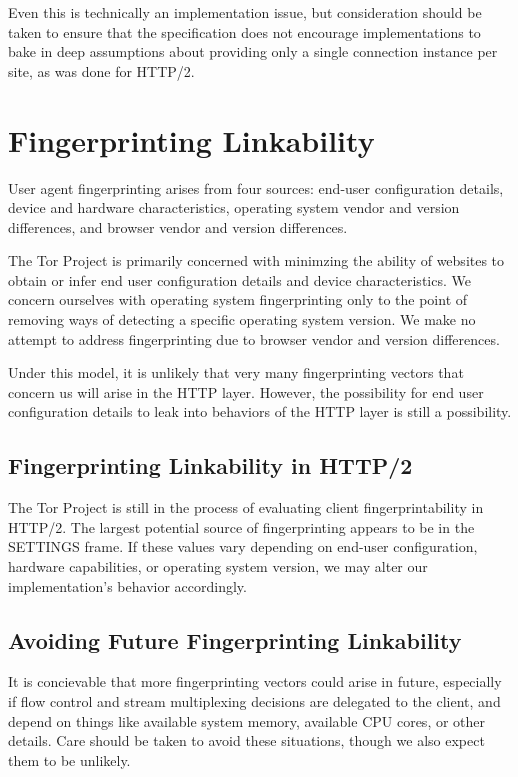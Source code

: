 \documentclass[letterpaper,11pt]{llncs}
\begin{document}
Even this is technically an implementation issue, but consideration should be
taken to ensure that the specification does not encourage implementations to
bake in deep assumptions about providing only a single connection instance per
site, as was done for HTTP/2.

\section{Fingerprinting Linkability}

User agent fingerprinting arises from four sources: end-user configuration
details, device and hardware characteristics, operating system vendor and
version differences, and browser vendor and version differences.

The Tor Project is primarily concerned with minimzing the ability of websites
to obtain or infer end user configuration details and device characteristics.
We concern ourselves with operating system fingerprinting only to the point of
removing ways of detecting a specific operating system version. We make no
attempt to address fingerprinting due to browser vendor and version
differences. %

Under this model, it is unlikely that very many fingerprinting vectors that
concern us will arise in the HTTP layer. However, the possibility for end user
configuration details to leak into behaviors of the HTTP layer is still a
possibility.

\subsection{Fingerprinting Linkability in HTTP/2}

The Tor Project is still in the process of evaluating client
fingerprintability in HTTP/2. The largest potential source of fingerprinting
appears to be in the SETTINGS frame. If these values vary depending on end-user
configuration, hardware capabilities, or operating system version, we may
alter our implementation's behavior accordingly.

\subsection{Avoiding Future Fingerprinting Linkability}

It is concievable that more fingerprinting vectors could arise in future,
especially if flow control and stream multiplexing decisions are delegated to
the client, and depend on things like available system memory, available CPU
cores, or other details. Care should be taken to avoid these situations,
though we also expect them to be unlikely.
\end{document}
